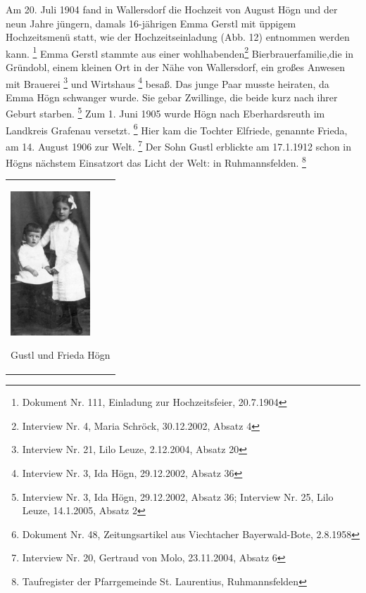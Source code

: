 Am 20. Juli 1904 fand in Wallersdorf die Hochzeit von August Högn und
der neun Jahre jüngern, damals 16-jährigen Emma Gerstl mit üppigem
Hochzeitsmenü statt, wie der Hochzeitseinladung (Abb. 12) entnommen
werden kann. \footnote{Dokument Nr. 111, Einladung zur Hochzeitsfeier,
20.7.1904} Emma Gerstl stammte aus einer wohlhabenden\footnote{
Interview Nr. 4, Maria Schröck, 30.12.2002, Absatz 4}
Bierbrauerfamilie,die in Gründobl, einem
kleinen Ort in der Nähe von Wallersdorf, ein großes Anwesen mit
Brauerei \footnote{Interview Nr. 21, Lilo Leuze, 2.12.2004, Absatz 20}
und Wirtshaus \footnote{Interview Nr. 3, Ida Högn, 29.12.2002, Absatz
36} besaß. Das junge Paar musste heiraten, da Emma Högn schwanger
wurde. Sie gebar Zwillinge, die beide kurz nach ihrer Geburt
starben. \footnote{Interview Nr. 3, Ida Högn, 29.12.2002, Absatz 36;
Interview Nr. 25, Lilo Leuze, 14.1.2005, Absatz 2} Zum 1. Juni 1905
wurde Högn nach Eberhardsreuth im Landkreis Grafenau
versetzt. \footnote{Dokument Nr. 48, Zeitungsartikel aus Viechtacher
Bayerwald-Bote, 2.8.1958} Hier kam die Tochter Elfriede, genannte
Frieda, am 14. August 1906 zur Welt. \footnote{Interview Nr. 20,
Gertraud von Molo, 23.11.2004, Absatz 6} Der Sohn Gustl erblickte am
17.1.1912 schon in Högns nächstem Einsatzort das Licht der Welt: in
Ruhmannsfelden. \footnote{Taufregister der Pfarrgemeinde St.
Laurentius, Ruhmannsfelden}

\begin{center}
\begin{minipage}{3.373cm}
\begin{center}
\tablefirsthead{}
\tablehead{}
\tabletail{}
\tablelasttail{}
\begin{supertabular}{m{3.1729999cm}}

\includegraphics[width=2.99cm,height=5.408cm]{pictures/zulassungsarbeit-img015.jpg}

Gustl und Frieda Högn\\
\end{supertabular}
\end{center}
\end{minipage}
\end{center}
